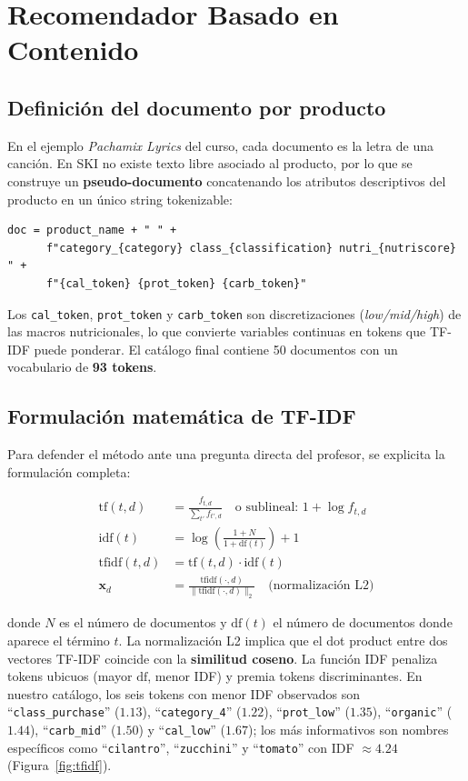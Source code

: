 \documentclass[12pt,a4paper]{article}
\newcommand{\metric}[1]{\textcolor{metricblue}{\textbf{#1}}}
\newcommand{\code}[1]{\texttt{\small #1}}
\begin{document}
\section{Recomendador Basado en Contenido}

\subsection{Definición del documento por producto}
En el ejemplo \textit{Pachamix Lyrics} del curso, cada documento es la letra de una canción. En SKI no existe texto libre asociado al producto, por lo que se construye un \textbf{pseudo-documento} concatenando los atributos descriptivos del producto en un único string tokenizable:

\begin{lstlisting}[style=pystyle]
doc = product_name + " " +
      f"category_{category} class_{classification} nutri_{nutriscore} " +
      f"{cal_token} {prot_token} {carb_token}"
\end{lstlisting}

Los \code{cal\_token}, \code{prot\_token} y \code{carb\_token} son discretizaciones (\textit{low/mid/high}) de las macros nutricionales, lo que convierte variables continuas en tokens que TF-IDF puede ponderar. El catálogo final contiene 50 documentos con un vocabulario de \metric{93 tokens}.

\subsection{Formulación matemática de TF-IDF}
\label{sec:tfidf}

Para defender el método ante una pregunta directa del profesor, se explicita la formulación completa:

\begin{align}
\text{tf}(t, d) &= \frac{f_{t,d}}{\sum_{t'} f_{t',d}}\quad\text{o sublineal: } 1 + \log f_{t,d} \\
\text{idf}(t) &= \log\left(\frac{1 + N}{1 + \text{df}(t)}\right) + 1 \\
\text{tfidf}(t, d) &= \text{tf}(t, d) \cdot \text{idf}(t) \\
\mathbf{x}_d &= \frac{\text{tfidf}(\cdot, d)}{\|\text{tfidf}(\cdot, d)\|_2}\quad\text{(normalización L2)}
\end{align}

donde $N$ es el número de documentos y $\text{df}(t)$ el número de documentos donde aparece el término $t$. La normalización L2 implica que el dot product entre dos vectores TF-IDF coincide con la \textbf{similitud coseno}. La función IDF penaliza tokens ubicuos (mayor $\text{df}$, menor IDF) y premia tokens discriminantes. En nuestro catálogo, los seis tokens con menor IDF observados son ``\code{class\_purchase}'' ($1.13$), ``\code{category\_4}'' ($1.22$), ``\code{prot\_low}'' ($1.35$), ``\code{organic}'' ($1.44$), ``\code{carb\_mid}'' ($1.50$) y ``\code{cal\_low}'' ($1.67$); los más informativos son nombres específicos como ``\code{cilantro}'', ``\code{zucchini}'' y ``\code{tomato}'' con IDF $\approx 4.24$ (Figura~\ref{fig:tfidf}).
\end{document}
